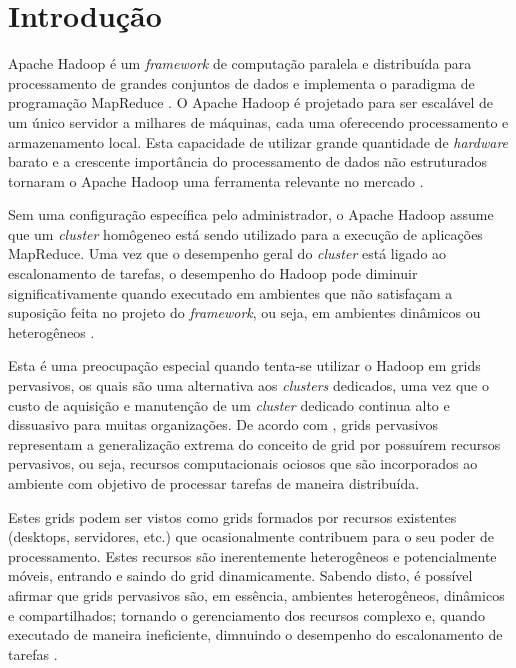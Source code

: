 \chapter{Introdução}
\label{chap:Intro}
Apache Hadoop é um \textit{framework} de computação paralela e distribuída para processamento de grandes conjuntos de dados e implementa o paradigma de programação \mbox{MapReduce} \cite{Dean2008}. O Apache Hadoop é projetado para ser escalável de um único servidor a milhares de máquinas, cada uma oferecendo processamento e armazenamento local. Esta capacidade de utilizar grande quantidade de \textit{hardware} barato e a crescente importância do processamento de dados não estruturados tornaram o Apache Hadoop uma ferramenta relevante no mercado \cite{Su}.

%
%

Sem uma configuração específica pelo administrador, o Apache Hadoop assume que um \textit{cluster} homôgeneo está sendo utilizado para a execução de aplicações MapReduce. Uma vez que o desempenho geral do \textit{cluster} está ligado ao escalonamento de tarefas, o desempenho do Hadoop pode diminuir significativamente quando executado em ambientes que não satisfaçam a suposição feita no projeto do \textit{framework}, ou seja, em ambientes dinâmicos ou heterogêneos \cite{Kumar2012}.

Esta é uma preocupação especial quando tenta-se utilizar o Hadoop em grids pervasivos, os quais são uma alternativa aos \textit{clusters} dedicados, uma vez que o custo de aquisição e manutenção de um \textit{cluster} dedicado continua alto e dissuasivo para muitas organizações. De acordo com \cite{Parashar2010}, grids pervasivos representam a generalização  extrema do conceito de grid por possuírem recursos pervasivos, ou seja, recursos computacionais ociosos que são incorporados ao ambiente com objetivo de processar tarefas de maneira distribuída. 

Estes grids podem ser vistos como grids formados por recursos existentes (desktops, servidores, etc.) que ocasionalmente contribuem para o seu poder de processamento. Estes recursos são inerentemente heterogêneos e potencialmente móveis, entrando e saindo do grid dinamicamente. Sabendo disto, é possível afirmar que grids pervasivos são, em essência, ambientes heterogêneos, dinâmicos e compartilhados; tornando o gerenciamento dos recursos complexo e, quando executado de maneira ineficiente, dimnuindo  o desempenho do escalonamento de tarefas \cite{Nascimento}.

